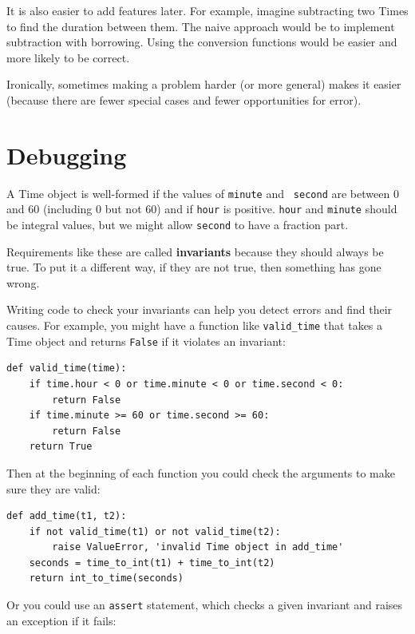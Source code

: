 \documentclass[12pt,a4paper,final,twoside,onecolumn,titlepage]{book}
\begin{document}
It is also easier to add features later.  For example, imagine
subtracting two Times to find the duration between them.  The
naive approach would be to implement subtraction with borrowing.
Using the conversion functions would be easier and more likely to be
correct.

Ironically, sometimes making a problem harder (or more general) makes it
easier (because there are fewer special cases and fewer opportunities
for error).


\section{Debugging}

A Time object is well-formed if the values of {\tt minute} and {\tt
second} are between 0 and 60 (including 0 but not 60) and if 
{\tt hour} is positive.  {\tt hour} and {\tt minute} should be
integral values, but we might allow {\tt second} to have a
fraction part.

Requirements like these are called {\bf invariants} because
they should always be true.  To put it a different way, if they
are not true, then something has gone wrong.

Writing code to check your invariants can help you detect errors
and find their causes.  For example, you might have a function
like \verb"valid_time" that takes a Time object and returns
{\tt False} if it violates an invariant:

\begin{verbatim}
def valid_time(time):
    if time.hour < 0 or time.minute < 0 or time.second < 0:
        return False
    if time.minute >= 60 or time.second >= 60:
        return False
    return True
\end{verbatim}
%
Then at the beginning of each function you could check the
arguments to make sure they are valid:

\begin{verbatim}
def add_time(t1, t2):
    if not valid_time(t1) or not valid_time(t2):
        raise ValueError, 'invalid Time object in add_time'
    seconds = time_to_int(t1) + time_to_int(t2)
    return int_to_time(seconds)
\end{verbatim}
%
Or you could use an {\tt assert} statement, which checks a given invariant
and raises an exception if it fails:
\end{document}
